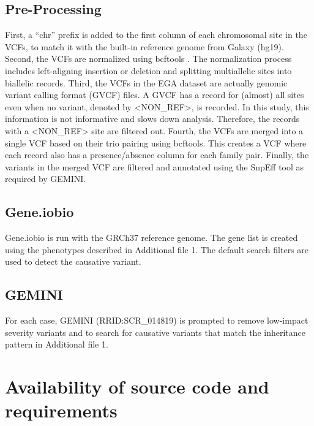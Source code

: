 \subsection*{Pre-Processing}
First, a ``chr'' prefix is added to the first column of each chromosomal site in the VCFs, to match it with the built-in reference genome from Galaxy (hg19). Second, the VCFs are normalized using bcftools \cite{bcftools}. The normalization process includes left-aligning insertion or deletion and splitting multiallelic sites into biallelic records. Third, the VCFs in the EGA dataset are actually genomic variant calling format (GVCF) files. A GVCF has a record for (almost) all sites even when no variant, denoted by <NON\_REF>, is recorded. In this study, this information is not informative and slows down analysis. Therefore, the records with a <NON\_REF> site are filtered out. Fourth, the VCFs are merged into a single VCF based on their trio pairing using bcftools. This creates a VCF where each record also has a presence/absence column for each family pair. Finally, the variants in the merged VCF are filtered and annotated using the SnpEff tool \cite{SnpEff} as required by GEMINI. 

\subsection*{Gene.iobio}
Gene.iobio is run with the GRCh37 reference genome. The gene list is created using the phenotypes described in Additional file 1. The default search filters are used to detect the causative variant.

\subsection*{GEMINI}
For each case, GEMINI (RRID:SCR\_014819) is prompted to remove low-impact severity variants and to search for causative variants that match the inheritance pattern in Additional file 1.

\section*{Availability of source code and requirements}

